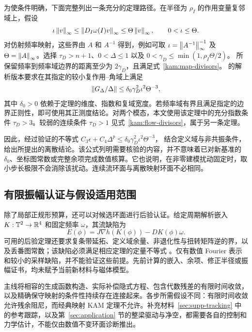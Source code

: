 为使条件明确，下面完整列出一条充分的定理路径。在半径为 $\rho_I$ 的作用变量复邻域上，假设
\begin{equation}\label{ss:twist-bounds}
 \iota\left\lVert v\right\rVert_\infty\le\left\lVert D_I\omega(I)v\right\rVert_\infty
                   \le\Theta\left\lVert v\right\rVert_\infty,
 \qquad0<\iota\le\Theta.
\end{equation}
对仿射频率映射，这些界由 $A$ 和 $A^{-1}$ 得到，例如可取 $\iota=\left\lVert A^{-1}\right\rVert_\infty^{-1}$ 及 $\Theta=\left\lVert A\right\rVert_\infty$。选择 $\tau_D>n+1$、$0<\Delta\le1$ 以及
$0<\gamma_D\le\min(1,\rho_I\Theta/2)$。
所保留频率到频率域边界的距离至少为 $2\gamma_D$，且满足式~\eqref{kam:map-divisors}。\citet[Theorem~2 and Remark~2]{shang} 的解析版本要求在其指定的较小复作用--角域上满足
\begin{equation}\label{ss:map-threshold}
 \left\lVert G_\Delta/\Delta\right\rVert
       \le\delta_0\gamma_D^2\iota^2\Theta^{-3},
\end{equation}
其中 $\delta_0>0$ 依赖于定理的维度、指数和复域宽度。若频率域有界且满足指定的边界正则性，即可使用其正测度结论。对两个模态，本文使用该定理中的充分指数条件 $\tau_D>3$。较弱的连续条件 $\tau_D>1$ 见式~\eqref{kam:flow-divisors}，属于另一条定理。

因此，经过验证的不等式
$C_3\epsilon+C_4\Delta^p\le\delta_0\gamma_D^2\iota^2\Theta^{-3}$，
结合定义域与非共振条件，给出所提出的离散结论。该公式列明需要核验的内容，并不意味着已对新基准的 $\delta_0$、坐标图常数或完整余项完成数值核算。它也说明，在非零建模扰动固定时，取小步长极限不会消除该扰动。连续流环面与离散映射环面不必相同。

\subsection{有限振幅认证与假设适用范围}
\label{ss:certificate-scope}

除了局部正规形预算，还可以对候选环面进行后验认证。给定周期解析嵌入 $K:\mathbb T^2\to\mathbb R^4$ 和固定频率 $\omega$，其流缺陷为
\[
 E(\phi)=J\nabla h(K(\phi))-D K(\phi)\omega.
\]
可用的后验定理还要求复条带延拓、定义域余量、非退化性与扭转矩阵逆的界，以及丢番图常数；该缺陷必须满足相应定理的定量不等式 \citep{haro2019aposteriori}。仅有数值 Fourier 表示和较小的采样缺陷，并不能验证这些前提。先前计算的嵌入、余项、修正半径或振幅证书，均未赋予当前新材料与磁体模型。

主线将相容的生成函数构造、实际补偿隐式方程、包含代数残差的有限时间收敛，以及精确保守映射的条件性持续存在连接起来。各步所需假设不同：有限时间收敛允许残余阻尼，而经典映射 KAM 定理不允许。补充材料~\ref{sec:supp-tracking} 中的参考跟踪，以及第~\ref{sec:application} 节的整梁驱动与净空，都需要各自的控制和力学估计，不能仅由数值不变环面诊断推出。

